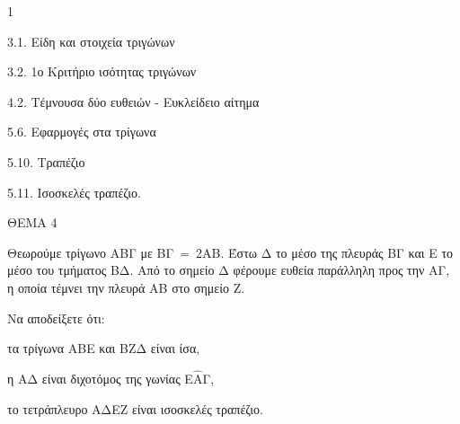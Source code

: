 \begin{ylh}{1}
    \item 3.1. Είδη και στοιχεία τριγώνων
    \item 3.2. 1ο Κριτήριο ισότητας τριγώνων
    \item 4.2. Τέμνουσα δύο ευθειών - Ευκλείδειο αίτημα
    \item 5.6. Εφαρμογές στα τρίγωνα
    \item 5.10. Τραπέζιο
    \item 5.11. Ισοσκελές τραπέζιο.
\end{ylh}

ΘΕΜΑ 4

Θεωρούμε τρίγωνο ΑΒΓ με ΒΓ$\  = \ $2ΑΒ. Έστω Δ το μέσο της πλευράς ΒΓ και Ε το μέσο του τμήματος ΒΔ. Από το σημείο Δ φέρουμε ευθεία παράλληλη προς την ΑΓ, η οποία τέμνει την πλευρά ΑΒ στο σημείο Ζ.

Να αποδείξετε ότι:

\begin{alist}
\item τα τρίγωνα ΑΒΕ και ΒΖΔ είναι ίσα, 

\item η ΑΔ είναι διχοτόμος της γωνίας Ε$\widehat{\text{Α}}$Γ, 

\item το τετράπλευρο ΑΔΕΖ είναι ισοσκελές τραπέζιο. 
\end{alist}
